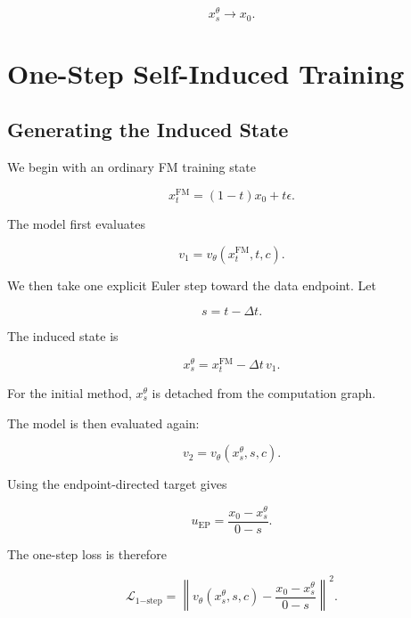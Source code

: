 \documentclass[11pt]{article}
\begin{document}
\begin{equation}
x_s^\theta
\longrightarrow
x_0.
\end{equation}

\section{One-Step Self-Induced Training}

\subsection{Generating the Induced State}

We begin with an ordinary FM training state

\begin{equation}
x_t^{\mathrm{FM}}
=
(1-t)x_0+t\epsilon.
\end{equation}

The model first evaluates

\begin{equation}
v_1
=
v_\theta(x_t^{\mathrm{FM}},t,c).
\end{equation}

We then take one explicit Euler step toward the data endpoint. Let

\begin{equation}
s=t-\Delta t.
\end{equation}

The induced state is

\begin{equation}
\boxed{
x_s^\theta
=
x_t^{\mathrm{FM}}
-
\Delta t\,v_1.
}
\end{equation}

For the initial method, $x_s^\theta$ is detached from the computation graph.

The model is then evaluated again:

\begin{equation}
v_2
=
v_\theta(x_s^\theta,s,c).
\end{equation}

Using the endpoint-directed target gives

\begin{equation}
u_{\mathrm{EP}}
=
\frac{x_0-x_s^\theta}{0-s}.
\end{equation}

The one-step loss is therefore

\begin{equation}
\boxed{
\mathcal{L}_{1\mathrm{-step}}
=
\left\|
v_\theta(x_s^\theta,s,c)
-
\frac{x_0-x_s^\theta}{0-s}
\right\|^2.
}
\end{equation}
\end{document}
